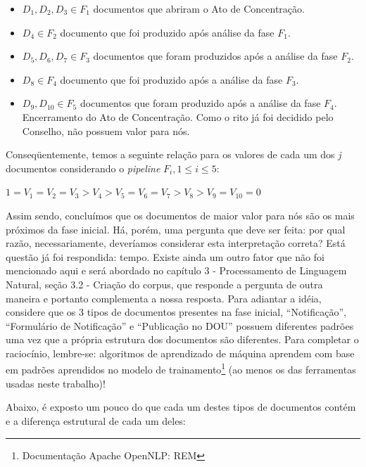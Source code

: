 \documentclass[11pt]{report}
\newcommand{\quotes}[1]{``#1''}
\begin{document}
\begin{itemize}
  \item $D_1, D_2, D_3 \in F_1$ documentos que abriram o Ato de Concentração.
  \item $D_4 \in F_2$ documento que foi produzido após análise da fase $F_1$.
  \item $D_5, D_6, D_7 \in F_3$ documentos que foram produzidos após a análise da fase $F_2$.
  \item $D_8 \in F_4$ documento que foi produzido após a análise da fase $F_3$.
  \item $D_9, D_{10} \in F_5$ documentos que foram produzido após a análise da fase $F_4$. Encerramento do Ato de Concentração. Como o rito já foi decidido pelo Conselho,
  não possuem valor para nós.
\end{itemize}

Conseqüentemente, temos a seguinte relação para os valores de cada um dos \textit{j} documentos considerando o \textit{pipeline} $F_i, 1 \leq i \leq 5$:
\begin{center}
  $1 = V_1 = V_2 = V_3 > V_4 > V_5 = V_6 = V_7 > V_8 > V_9 = V_{10} = 0$
\end{center}

Assim sendo, concluímos que os documentos de maior valor para nós são os mais próximos da fase inicial. Há, porém, uma pergunta que deve ser feita: por qual razão,
necessariamente, deveríamos considerar esta interpretação correta? Está questão já foi respondida: tempo. Existe ainda um outro fator que não foi mencionado aqui e será abordado
no capítulo 3 - Processamento de Linguagem Natural, seção 3.2 - Criação do corpus, que responde a pergunta de outra maneira e portanto complementa a nossa resposta. Para adiantar a idéia, considere que os 3 tipos de
documentos presentes na fase inicial, \quotes{Notificação}, \quotes{Formulário de Notificação} e \quotes{Publicação no DOU} possuem diferentes padrões uma vez que a própria
estrutura dos documentos são diferentes. Para completar o raciocínio, lembre-se: algoritmos de aprendizado de máquina aprendem com base em padrões aprendidos no modelo
de trainamento\footnote[6]{Documentação Apache OpenNLP: REM} (ao menos os das ferramentas usadas neste trabalho)!

Abaixo, é exposto um pouco do que cada um destes tipos de documentos contém e a diferença estrutural de cada um deles:
\end{document}
